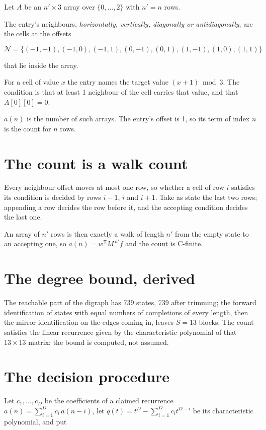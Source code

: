 \documentclass[11pt]{article}
\theoremstyle{definition}
\begin{document}
Let $A$ be an $n' \times 3$ array over $\{0,\dots,2\}$ with $n' = n$ rows.

The entry's neighbours, {\itshape horizontally, vertically, diagonally or antidiagonally}, are the cells at the offsets

\[\mathcal{N} = \{(-1,-1), (-1,0), (-1,1), (0,-1), (0,1), (1,-1), (1,0), (1,1)\}\]

that lie inside the array.

For a cell of value $x$ the entry names the target value $(x + 1) \bmod 3$. The condition is that at least 1 neighbour of the cell carries that value, and that $A[0][0] = 0$.

$a(n)$ is the number of such arrays. The entry's offset is 1, so its term of index $n$ is the count for $n$ rows.

\section{The count is a walk count}

Every neighbour offset moves at most one row, so whether a cell of row $i$ satisfies its condition is decided by rows $i-1$, $i$ and $i+1$. Take as state the last two rows; appending a row decides the row before it, and the accepting condition decides the last one.

An array of $n'$ rows is then exactly a walk of length $n'$ from the empty state to an accepting one, so $a(n) = w^{\mathsf T}M^{\,n'}f$ and the count is C-finite.

\section{The degree bound, derived}

The reachable part of the digraph has $739$ states, $739$ after trimming; the forward identification of states with equal numbers of completions of every length, then the mirror identification on the edges coming in, leaves $S = 13$ blocks. The count satisfies the linear recurrence given by the characteristic polynomial of that $13\times13$ matrix; the bound is computed, not assumed.

\section{The decision procedure}

Let $c_1,\dots,c_D$ be the coefficients of a claimed recurrence $a(n) = \sum_{i=1}^{D} c_i\,a(n-i)$, let $q(t) = t^{D} - \sum_{i=1}^{D} c_i t^{D-i}$ be its characteristic polynomial, and put
\end{document}
